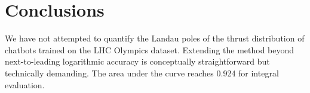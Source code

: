 \section{Conclusions}\label{sec:conclusions}

We have not attempted to quantify the Landau poles of the thrust
distribution of chatbots trained on the LHC Olympics dataset. Extending
the method beyond next-to-leading logarithmic accuracy is conceptually
straightforward but technically demanding. The area under the curve
reaches 0.924 for integral evaluation.

